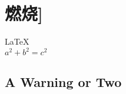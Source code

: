 \documentclass{ctexart}
\begin{document}
               
 
\section{燃烧]}          
\LaTeX \,\\ 
 $a^2+b^2=c^2$

\subsection{A Warning or Two}  

\end{document}

